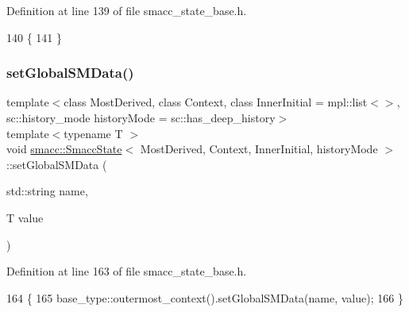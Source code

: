 Definition at line 139 of file smacc\+\_\+state\+\_\+base.\+h.


\begin{DoxyCode}
140     \{
141     \}
\end{DoxyCode}
\mbox{\label{classsmacc_1_1SmaccState_a98f2673b257479e0a3615d5d8279a591}} 
\subsubsection{\texorpdfstring{set\+Global\+S\+M\+Data()}{setGlobalSMData()}}
{\footnotesize\ttfamily template$<$class Most\+Derived, class Context, class Inner\+Initial = mpl\+::list$<$$>$, sc\+::history\+\_\+mode history\+Mode = sc\+::has\+\_\+deep\+\_\+history$>$ \\
template$<$typename T $>$ \\
void \hyperlink{classsmacc_1_1SmaccState}{smacc\+::\+Smacc\+State}$<$ Most\+Derived, Context, Inner\+Initial, history\+Mode $>$\+::set\+Global\+S\+M\+Data (\begin{DoxyParamCaption}\item[{std\+::string}]{name,  }\item[{T}]{value }\end{DoxyParamCaption})\hspace{0.3cm}{\ttfamily [inline]}}



Definition at line 163 of file smacc\+\_\+state\+\_\+base.\+h.


\begin{DoxyCode}
164     \{
165       base\_type::outermost\_context().setGlobalSMData(name, value);
166     \}
\end{DoxyCode}
\mbox{\label{classsmacc_1_1SmaccState_a1dccb401e1a99031863a21a590d953e6}} 
